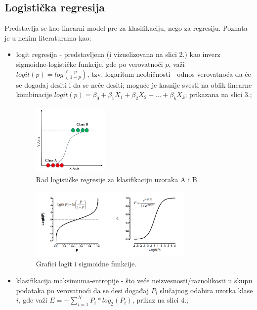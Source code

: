 \documentclass[fontsize=12bp, paper=a4]{scrarticle}
\begin{document}
\subsection{Logistička regresija}
Predstavlja se kao linearni model pre za klasifikaciju, nego za regresiju. Poznata je u nekim literaturama kao:
\begin{itemize}
    \item logit regresija - predstavljena (i vizuelizovana na slici 2.) kao inverz sigmoidne-logističke funkcije, gde po verovatnoći $p$, važi $logit(p) = log(\frac{p}{1-p})$\cite{logit}, tzv. logaritam neobičnosti - odnos verovatnoća da će se događaj desiti i da se neće desiti; moguće je kasnije svesti na oblik linearne kombinacije $logit(p) = \beta_0 + \beta_1X_1 + \beta_2X_2 + ... + \beta_kX_k$\cite{logit2}; prikazana na slici 3.;
    \begin{figure}[h!]
        \centering
        \includegraphics[width=0.35\textwidth]{image-5.png}
        \caption{Rad logističke regresije za klasifikaciju uzoraka A i B.}
    \end{figure}
    \begin{figure}[h!]
        \centering
        \includegraphics[width=0.75\textwidth]{image-1.png}
        \caption{Grafici logit i sigmoidne funkcije.}
    \end{figure}
    \item klasifikacija maksimuma-entropije - što veće neizvesnosti/raznolikosti u skupu podataka\cite{entropy} po verovatnoći da se desi događaj $P_i$ slučajnog odabira uzorka klase $i$, gde važi $E = - \sum^N_{i=1}P_i * log_2(P_i)$, prikaz na slici 4.;
    \begin{figure}[h!]

\end{figure}
\end{itemize}
\end{document}
